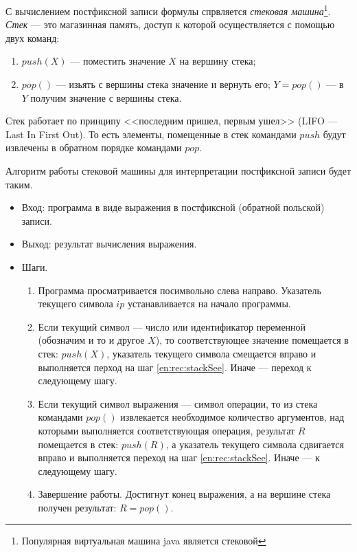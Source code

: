 С вычислением постфиксной записи формулы спрвляется \emph{стековая машина}\footnote{Популярная виртуальная машина java является стековой}. \emph{Стек} --- это магазинная память, доступ к которой осуществляется с помощью двух команд:
\begin{enumerate}
    \item $push(X)$ --- поместить значение $X$ на вершину стека;
    \item $pop()$ --- изьять с вершины стека значение и вернуть его; $Y=pop()$ --- в $Y$ получим значение с вершины стека.
\end{enumerate}

Стек работает по принципу <<последним пришел, первым ушел>> (LIFO --- Last In First Out). То есть элементы, помещенные в стек командами $push$ будут извлечены в обратном порядке командами $pop$.

Алгоритм работы стековой машины для интерпретации постфиксной записи будет таким.
\begin{itemize}
    \item Вход: программа в виде выражения в постфиксной (обратной польской) записи.
    \item Выход: результат вычисления выражения.
    \item Шаги.
    \begin{enumerate}
        \item Программа просматривается посимвольно слева направо. Указатель текущего символа $ip$ устанавливается на начало программы.
        
        \item \label{en:rec:stackSee}Если текущий символ --- число или идентификатор переменной (обозначим и то и другое $X$), то соответствующее значение помещается в стек: $push(X)$, указатель текущего символа смещается вправо и выполняется перход на шаг \ref{en:rec:stackSee}. Иначе --- переход к следующему шагу.
        
        \item Если текущий символ выражения --- символ операции, то из стека командами $pop()$ извлекается необходимое количество аргументов, над которыми выполняется соответствующая операция, результат $R$ помещается в стек: $push(R)$, а указатель текущего символа сдвигается вправо и выполняется переход на шаг \ref{en:rec:stackSee}. Иначе --- к следующему шагу.
        
        \item Завершение работы. Достигнут конец выражения, а на вершине стека получен результат: $R=pop()$.
    \end{enumerate}
\end{itemize}

